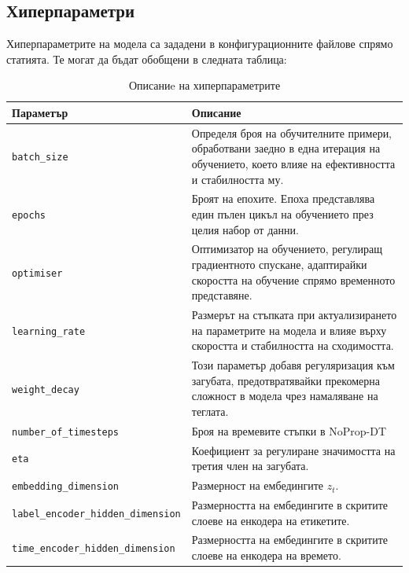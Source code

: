 \documentclass[a4paper,11pt]{article}
\begin{document}
\subsection{Хиперпараметри}
Хиперпараметрите на модела са зададени в конфигурационните файлове спрямо статията. Те могат да бъдат обобщени в следната таблица:

\begin{table}[H]
  \centering
  \begin{tabular}{m{0.4\linewidth} m{0.6\linewidth}}
    \toprule
    \textbf{Параметър} & \textbf{Описание} \\
    \midrule
    \texttt{batch\_size} & Определя броя на обучителните примери, обработвани заедно в една итерация на обучението, което влияе на ефективността и стабилността му. \\
    \midrule
    \texttt{epochs} & Броят на епохите. Епоха представлява един пълен цикъл на обучението през целия набор от данни. \\
    \midrule
    \texttt{optimiser} & Оптимизатор на обучението, регулиращ градиентното спускане, адаптирайки скоростта на обучение спрямо временното представяне. \\
    \midrule
    \texttt{learning\_rate} & Размерът на стъпката при актуализирането на параметрите на модела и влияе върху скоростта и стабилността на сходимостта. \\
    \midrule
    \texttt{weight\_decay} & Този параметър добавя регуляризация към загубата, предотвратявайки прекомерна сложност в модела чрез намаляване на теглата. \\
    \midrule
    \texttt{number\_of\_timesteps} & Броя на времевите стъпки в NoProp-DT \\
    \midrule
    \texttt{eta} & Коефициент за регулиране значимостта на третия член на загубата. \\
    \midrule
    \texttt{embedding\_dimension} & Размерност на ембедингите $z_t$. \\
    \midrule
    \texttt{label\_encoder\_hidden\_dimension} & Размерността на ембедингите в скритите слоеве на енкодера на етикетите. \\
    \midrule
    \texttt{time\_encoder\_hidden\_dimension} & Размерността на ембедингите в скритите слоеве на енкодера на времето. \\

    \bottomrule
  \end{tabular}  
  \caption{Описаниe на хиперпараметрите}
  \label{tab:hyperparameters}
\end{table}
\end{document}
